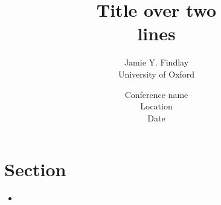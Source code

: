 \documentclass[
11pt,
a4paper
]{article}
\title{Title over two \\ lines}
\author{Jamie Y. Findlay\\\small University of Oxford\\\small\email{jamie.findlay@ling-phil.ox.ac.uk}}
\date{Conference name\\Location\\Date}
\begin{document}
\maketitle

\section{Section}

\begin{itemize}

\item \lipsum[1][1-3]

\end{itemize}




\end{document}
